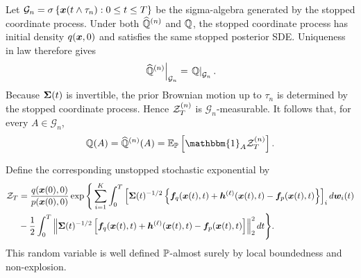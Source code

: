 Let $\mathcal{G}_n = \sigma\left\{ \boldsymbol{x}(t\wedge\tau_n):0\leq t\leq T \right\}$ be the sigma-algebra generated by the stopped coordinate process.
Under both $\widehat{\mathbb{Q}}^{(n)}$ and $\mathbb{Q}$, the stopped coordinate process has initial density $q(\boldsymbol{x},0)$ and satisfies the same stopped posterior SDE. 
Uniqueness in law therefore gives
\begin{equation*}
    \left.
    \widehat{\mathbb{Q}}^{(n)}
    \right|_{\mathcal G_n}
    =
    \left.
    \mathbb{Q}
    \right|_{\mathcal G_n}.
\end{equation*}
Because $\boldsymbol{\Sigma}(t)$ is invertible, the prior Brownian motion up to
$\tau_n$ is determined by the stopped coordinate process. Hence
$\mathcal{Z}_T^{(n)}$ is $\mathcal G_n$-measurable. It follows that, for every
$A\in\mathcal G_n$,
\begin{equation*}
    \bbQ(A)
    =
    \widehat{\bbQ}^{(n)}(A)
    =
    \bbE_{\bbP}\left[
        \mathbbm{1}_A\cZ_T^{(n)}
    \right].
\end{equation*}

Define the corresponding unstopped stochastic exponential by
{\small
\begin{equation*}
\begin{aligned}
    \mathcal{Z}_T &= \frac{q(\boldsymbol{x}(0),0)}{p(\boldsymbol{x}(0),0)} \exp\Bigg\{ \sum_{i=1}^K \int_0^T \left[ \boldsymbol{\Sigma}(t)^{-1/2} \left\{ \boldsymbol{f}_q(\boldsymbol{x}(t),t) +\boldsymbol{h}^{(\ell)}(\boldsymbol{x}(t),t) -\boldsymbol{f}_p(\boldsymbol{x}(t),t) \right\} \right]_i d\boldsymbol{w}_i(t) \\
    &- \frac{1}{2} \int_0^T \left\|    \boldsymbol{\Sigma}(t)^{-1/2} \left[\boldsymbol{f}_q(\boldsymbol{x}(t),t) +\boldsymbol{h}^{(\ell)}(\boldsymbol{x}(t),t)-\boldsymbol{f}_p(\boldsymbol{x}(t),t) \right] \right\|_2^2dt\Bigg\}.
\end{aligned}
\end{equation*}
}
This random variable is well defined $\mathbb{P}$-almost surely by local
boundedness and non-explosion.

